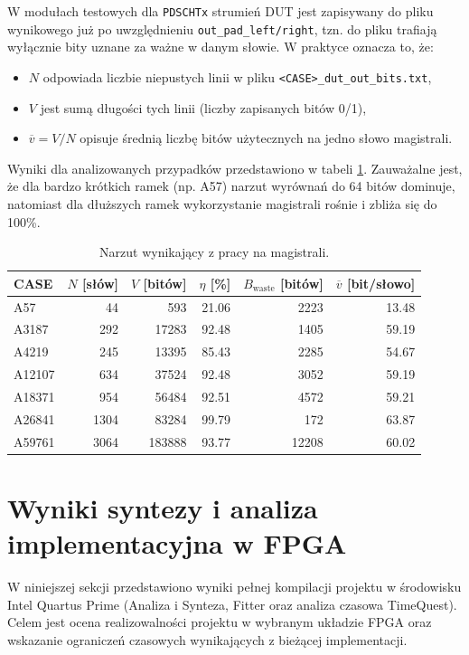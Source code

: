 W modułach testowych dla \texttt{PDSCHTx} strumień DUT jest zapisywany do pliku wynikowego już po uwzględnieniu
\texttt{out\_pad\_left/right}, tzn. do pliku trafiają wyłącznie bity uznane za ważne w danym słowie.
W praktyce oznacza to, że:
\begin{itemize}
    \item $N$ odpowiada liczbie niepustych linii w pliku \texttt{<CASE>\_dut\_out\_bits.txt},
    \item $V$ jest sumą długości tych linii (liczby zapisanych bitów 0/1),
    \item $\overline{v}=V/N$ opisuje średnią liczbę bitów użytecznych na jedno słowo magistrali.
\end{itemize}

Wyniki dla analizowanych przypadków przedstawiono w tabeli \ref{tab:pdsch_bus_overhead}. Zauważalne jest,
że dla bardzo krótkich ramek (np. A57) narzut wyrównań do 64 bitów dominuje, natomiast dla dłuższych ramek
wykorzystanie magistrali rośnie i zbliża się do 100\%.

\begin{table}[!ht]
\centering
\caption{Narzut wynikający z pracy na magistrali.}
\label{tab:pdsch_bus_overhead}
\begin{tabular}{lrrrrr}
\hline
CASE & $N$ [słów] & $V$ [bitów] & $\eta$ [\%] & $B_{\mathrm{waste}}$ [bitów] & $\overline{v}$ [bit/słowo] \\
\hline
A57     & 44   & 593    & 21.06 & 2223  & 13.48 \\
A3187   & 292  & 17283  & 92.48 & 1405  & 59.19 \\
A4219   & 245  & 13395  & 85.43 & 2285  & 54.67 \\
A12107  & 634  & 37524  & 92.48 & 3052  & 59.19 \\
A18371  & 954  & 56484  & 92.51 & 4572  & 59.21 \\
A26841  & 1304 & 83284  & 99.79 & 172   & 63.87 \\
A59761  & 3064 & 183888 & 93.77 & 12208 & 60.02 \\
\hline
\end{tabular}
\end{table}

\section{Wyniki syntezy i analiza implementacyjna w FPGA}
\label{sec:synteza_i_analiza_impl}

W niniejszej sekcji przedstawiono wyniki pełnej kompilacji projektu w środowisku Intel Quartus Prime
(Analiza i Synteza, Fitter oraz analiza czasowa TimeQuest). Celem jest ocena realizowalności projektu
w wybranym układzie FPGA oraz wskazanie ograniczeń czasowych wynikających z bieżącej implementacji.

